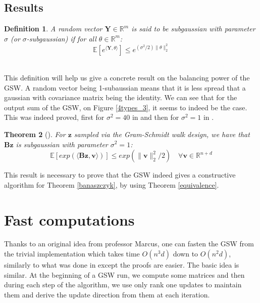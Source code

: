 \documentclass[12pt]{article}
\newtheorem{theorem}{Theorem}
\newtheorem{definition}[theorem]{Definition}
\begin{document}
\subsection{Results}
\begin{definition}
A random vector $\textbf{Y} \in \mathbb{R}^m$ is said to be subgaussian with parameter $\sigma$ (or $\sigma$-subgaussian) if for all $\theta \in \mathbb{R}^m$:
$$\mathbb{E}[e^{\langle\textbf{Y},\theta\rangle}]\leq e^{(\sigma^2/2)\|\theta\|_2^2}$$ \\
\end{definition}
This definition will help us give a concrete result on the balancing power of the GSW. A random vector being 1-subaussian means that it is less spread that a gaussian with covariance matrix being the identity. We can see that for the output sum of the GSW, on Figure \ref{4types_3}, it seems to indeed be the case. This was indeed proved, first for $\sigma^2=40$ in \cite{blues} and then for $\sigma^2=1$ in \cite{harshaw2019balancing}.
\begin{theorem}[\cite{harshaw2019balancing}]
    For $\textbf{z}$ sampled via the Gram-Schmidt walk design, we have that $\textbf{Bz}$ is subgaussian with parameter $\sigma^2=1$:$$\mathbb{E}[exp(\langle\textbf{Bz},\textbf{v}\rangle)]\leq exp(\|\textbf{v}\|^2_2/2)\quad\forall\textbf{v}\in\mathbb{R}^{n+d}$$
\end{theorem}
This result is necessary to prove that the GSW indeed gives a constructive algorithm for Theorem \ref{banaszczyk}, by using Theorem \ref{equivalence}. 
\section{Fast computations}
Thanks to an original idea from professor Marcus, one can fasten the GSW from the trivial implementation which takes time $O(n^3d)$ down to $O(n^2d)$, similarly to what was done in \cite{harshaw2018balancing} except the proofs are easier. The basic idea is similar. At the beginning of a GSW run, we compute some matrices and then during each step of the algorithm, we use only rank one updates to maintain them and derive the update direction from them at each iteration.
\end{document}
